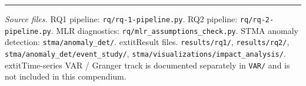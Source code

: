 \documentclass[11pt]{article}
\begin{document}
\vspace{0.5em}
\hrule
\vspace{0.3em}
{\footnotesize \textit{Source files.}
RQ1 pipeline: \texttt{rq/rq-1-pipeline.py}.
RQ2 pipeline: \texttt{rq/rq-2-pipeline.py}.
MLR diagnostics: \texttt{rq/mlr\_assumptions\_check.py}.
STMA anomaly detection: \texttt{stma/anomaly\_det/}.
	extit{Result files.} \texttt{results/rq1/}, \texttt{results/rq2/}, \texttt{stma/anomaly\_det/event\_study/}, \texttt{stma/visualizations/impact\_analysis/}.
	extit{Time-series VAR / Granger track is documented separately in \texttt{VAR/} and is not included in this compendium.}}
\end{document}
